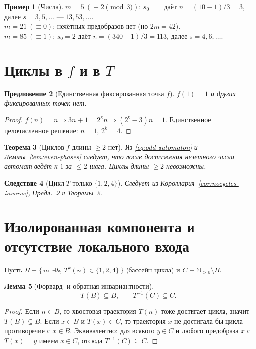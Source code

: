 \documentclass[a4paper,12pt]{article}
\theoremstyle{plain}
\newtheorem{theorem}{Теорема}[section]
\newtheorem{lemma}[theorem]{Лемма}
\newtheorem{proposition}[theorem]{Предложение}
\newtheorem{corollary}[theorem]{Следствие}
\theoremstyle{definition}
\newtheorem{example}[theorem]{Пример}
\begin{document}
\begin{example}[Числа]\label{ex:F1F2}
$m=5\ (\equiv2\!\!\!\pmod3)$: $s_0=1$ даёт $n=(10-1)/3=3$, далее $s=3,5,\dots$ — $13,53,\dots$. \\
$m=21\ (\equiv0)$: нечётных предобразов нет (но $2m=42$). \\
$m=85\ (\equiv1)$: $s_0=2$ даёт $n=(340-1)/3=113$, далее $s=4,6,\dots$.
\end{example}

\section{Циклы в $f$ и в $T$}\label{sec:nocycles}
\begin{proposition}[Единственная фиксированная точка $f$]\label{prop:fix}
$f(1)=1$ и других фиксированных точек нет.
\end{proposition}
\begin{proof}
$f(n)=n\Rightarrow 3n+1=2^k n\Rightarrow (2^k-3)n=1$. Единственное целочисленное решение: $n=1$, $2^k=4$.
\end{proof}

\begin{theorem}[Циклов $f$ длины $\ge2$ нет]\label{thm:nocycles-f}
Из \eqref{eq:odd-automaton} и Леммы~\ref{lem:even-phases} следует, что после достижения нечётного числа автомат ведёт к $1$ за $\le2$ шага. Циклы длины $\ge2$ невозможны.
\end{theorem}

\begin{corollary}[Цикл $T$ только $\{1,2,4\}$]\label{cor:nocyclesT}
Следует из Короллария~\ref{cor:nocycles-inverse}, Предл.~\ref{prop:fix} и Теоремы~\ref{thm:nocycles-f}.
\end{corollary}

\section{Изолированная компонента и отсутствие локального входа}\label{sec:noentry}
Пусть $B=\{\,n:\ \exists k,\ T^k(n)\in\{1,2,4\}\,\}$ (бассейн цикла) и $C=\mathbb N_{>0}\setminus B$.

\begin{lemma}[Форвард- и обратная инвариантности]\label{lem:partition}
\begin{equation}\label{eq:invariants}
T(B)\subseteq B,\qquad T^{-1}(C)\subseteq C.
\end{equation}
\end{lemma}
\begin{proof}
Если $n\in B$, то хвостовая траектория $T(n)$ тоже достигает цикла, значит $T(B)\subseteq B$. Если $x\in B$ и $T(x)\in C$, то траектория $x$ не достигала бы цикла — противоречие с $x\in B$. Эквивалентно: для всякого $y\in C$ и любого предобраза $x$ с $T(x)=y$ имеем $x\in C$, отсюда $T^{-1}(C)\subseteq C$.
\end{proof}
\end{document}
